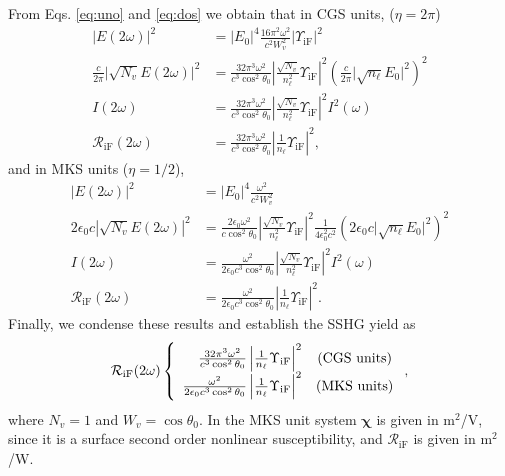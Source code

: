 From Eqs. \eqref{eq:uno} and \eqref{eq:dos} we obtain that in CGS units,
($\eta=2\pi$)
\begin{align}\label{eq:r01}
\vert E(2\omega)\vert^{2} &=
\vert E_{0}\vert^{4}\frac{16\pi^{2}\omega^{2}}{c^{2}W^2_{v}}
\vert\Upsilon_{\mathrm{iF}}\vert^{2}\nonumber\\
\frac{c}{2\pi}\vert\sqrt{N_{v}}E(2\omega)\vert^{2} &=
\frac{32\pi^{3}\omega^{2}}{c^{3}\cos^2\theta_{0}}
\left\vert\frac{\sqrt{N_{v}}}{n^{2}_{\ell}}\Upsilon_{\mathrm{iF}}\right\vert^{2} 
\left(\frac{c}{2\pi}\vert\sqrt{n_{\ell}}E_{0}\vert^{2}\right)^{2}\nonumber\\ 
I(2\omega) &=
\frac{32\pi^{3}\omega^{2}}{c^{3}\cos^2\theta_{0}}
\left\vert\frac{\sqrt{N_{v}}}{n^{2}_{\ell}}\Upsilon_{\mathrm{iF}}\right\vert^{2}
I^{2}(\omega)\nonumber\\
\mathcal{R}_{\mathrm{iF}}(2\omega) &=
\frac{32\pi^{3}\omega^{2}}{c^{3}\cos^2\theta_{0}}
\left\vert\frac{1}{n_{\ell}}\Upsilon_{\mathrm{iF}}\right\vert^{2},
\end{align} 
and in MKS units ($\eta=1/2$),
\begin{align}\label{r01m}
\vert E(2\omega)\vert^{2} &=
\vert E_{0}\vert^{4}\frac{\omega^{2}}{c^{2}W^{2}_{v}}\nonumber\\
2\epsilon_{0}c|\sqrt{N_{v}}E(2\omega)|^{2} &=
\frac{2\epsilon_{0}\omega^{2}}{c\cos^{2}\theta_{0}}
\left\vert\frac{\sqrt{N_{v}}}{n^{2}_{\ell}}\Upsilon_{\mathrm{iF}}\right\vert^{2} 
\frac{1}{4\epsilon^{2}_0c^{2}}
\left(2\epsilon_{0}c\vert\sqrt{n_{\ell}}E_{0}\vert^{2}\right)^{2}\nonumber\\
I(2\omega) &= 
\frac{\omega^{2}}{2\epsilon_{0}c^3\cos^{2}\theta_{0}}
\left\vert\frac{\sqrt{N_{v}}}{n^{2}_{\ell}}\Upsilon_{\mathrm{iF}}\right\vert^{2}
I^{2}(\omega)\nonumber\\
\mathcal{R}_{\mathrm{iF}}(2\omega) &=
\frac{\omega^{2}}{2\epsilon_{0}c^3\cos^{2}\theta_{0}}
\left\vert  \frac{1}{n_{\ell}}\Upsilon_{\mathrm{iF}}\right\vert^{2}.
\end{align}
Finally, we condense these results and establish the SSHG yield as
\begin{equation}\label{eq:mc6}
\mathcal{R}_{\mathrm{iF}}(2\omega) 
\left\{
\begin{array}{ r c } 
\frac{32\pi^{3}\omega^{2}}{c^{3}\cos^{2}\theta_{0}}
\left\vert\frac{1}{n_{\ell}}\Upsilon_{\mathrm{iF}}\right\vert^{2} 
& \text{(CGS units)} \\
\frac{\omega^{2}}{2\epsilon_{0}c^3\cos^{2}\theta_{0}}
\left\vert\frac{1}{n_{\ell}}\Upsilon_{\mathrm{iF}}\right\vert^{2} 
& \text{(MKS units)} 
\end{array}
\right.,
\end{equation}
where $N_{v}=1$ and $W_{v}=\cos\theta_{0}$. In the MKS unit system
$\boldsymbol{\chi}$ is given in m$^{2}$/V, since it is a surface second order
nonlinear susceptibility, and $\mathcal{R}_{\mathrm{iF}}$ is given in m$^2$/W.

